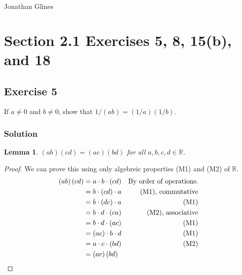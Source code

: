 \documentclass[12pt]{article}
\newtheorem{lem}{Lemma}
\begin{document}
\begin{flushright}
\Large{Jonathan Glines}
\end{flushright}
\section*{Section 2.1 Exercises 5, 8, 15(b), and 18}
\subsection*{Exercise 5}
If $a \ne 0$ and $b \ne 0$, show that $1/\left(ab\right) = \left(1/a\right)\left(1/b\right)$.


\subsubsection*{Solution}
\begin{lem}
$\left(ab\right)\left(cd\right) = \left(ac\right)\left(bd\right)$ for all $a, b, c, d \in \mathbb{R}$.
\end{lem}

\begin{proof} We can prove this using only algebreic properties (M1) and (M2) of $\mathbb{R}$.
\begin{align*}
\left(ab\right)\left(cd\right) &= a \cdot b \cdot \left(cd\right) & \text{By order of operations.}\\
&= b \cdot \left(cd\right) \cdot a & \text{(M1), commutative}\\
&= b \cdot \left(dc\right) \cdot a & \text{(M1)}\\
&= b \cdot d \cdot \left(ca\right) & \text{(M2), associative}\\
&= b \cdot d \cdot \left(ac\right) & \text{(M1)}\\
&= \left(ac\right) \cdot b \cdot d & \text{(M1)}\\
&= a \cdot c \cdot \left(bd\right) & \text{(M2)}\\
&= \left(ac\right)\left(bd\right) & \qedhere
\end{align*}
\end{proof}
\end{document}
